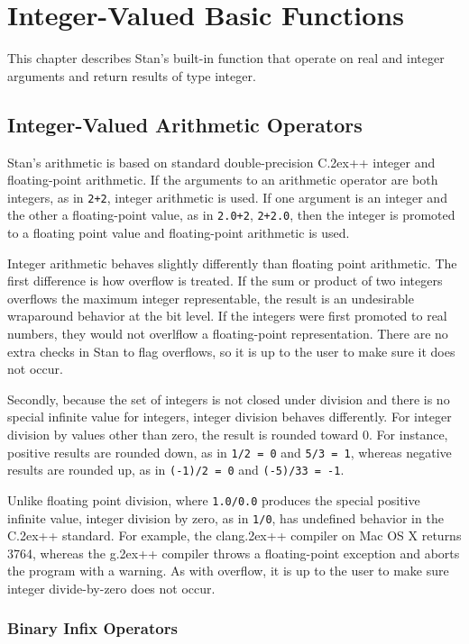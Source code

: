 \documentclass[10pt]{report}
\newcommand{\Stan}{Stan\xspace}
\newcommand*{\Cpp}{C\raise.2ex\hbox{\footnotesize ++}\xspace} %
\newcommand{\clang}{{\ttfamily clang\raise.2ex\hbox{\footnotesize ++}}\xspace}
\newcommand{\gpp}{{\ttfamily g\raise.2ex\hbox{\footnotesize ++}}\xspace}
\newcommand{\code}[1]{{\tt #1}}
\begin{document}
\chapter{Integer-Valued Basic Functions}

This chapter describes \Stan's built-in function that operate on real
and integer arguments and return results of type integer.


\section{Integer-Valued Arithmetic Operators}

\Stan's arithmetic is based on standard double-precision \Cpp integer and
floating-point arithmetic.  If the arguments to an arithmetic operator
are both integers, as in \code{2+2}, integer arithmetic is used.  If
one argument is an integer and the other a floating-point value, as in
\code{2.0+2}, \code{2+2.0}, then the integer is promoted to a floating
point value and floating-point arithmetic is used.

Integer arithmetic behaves slightly differently than floating point
arithmetic.  The first difference is how overflow is treated.  If the
sum or product of two integers overflows the maximum integer
representable, the result is an undesirable wraparound behavior at the
bit level.  If the integers were first promoted to real numbers, they
would not overlflow a floating-point representation.  There are no
extra checks in \Stan to flag overflows, so it is up to the user to
make sure it does not occur.

Secondly, because the set of integers is not closed under division and
there is no special infinite value for integers, integer division
behaves differently.  For integer division by values other than zero,
the result is rounded toward 0.  For instance, positive results are
rounded down, as in \code{1/2 = 0} and \code{5/3 = 1}, whereas
negative results are rounded up, as in \code{(-1)/2 = 0} and
\code{(-5)/33 = -1}.

Unlike floating point division, where \code{1.0/0.0} produces the
special positive infinite value, integer division by zero, as in
\code{1/0}, has undefined behavior in the \Cpp standard.  For example,
the \clang compiler on Mac OS X returns 3764, whereas the \gpp
compiler throws a floating-point exception and aborts the program with
a warning.  As with overflow, it is up to the user to make sure
integer divide-by-zero does not occur.

\subsection{Binary Infix Operators}
\end{document}
